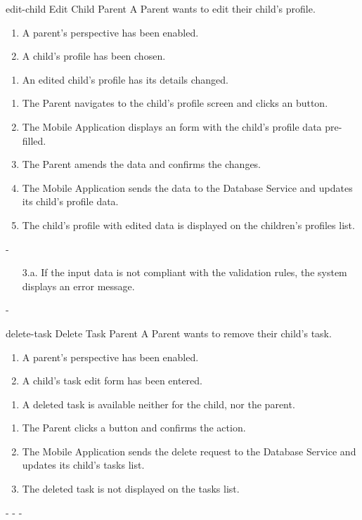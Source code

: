 {edit-child}
{Edit Child}
{Parent}
{A Parent wants to edit their child's profile.}
{\begin{enumerate} %
    \item A parent's perspective has been enabled.
    \item A child's profile has been chosen.
\end{enumerate}}
{\begin{enumerate} %
   \item An edited child's profile has its details changed.
\end{enumerate}}
{\begin{enumerate} %
   \item The Parent navigates to the child's profile screen and clicks an  button.
   \item The Mobile Application displays an  form with the child's profile data pre-filled.
   \item The Parent amends the data and confirms the changes.
   \item The Mobile Application sends the data to the Database Service and updates its child's profile data.
   \item The child's profile with edited data is displayed on the children's profiles list.
\end{enumerate}}
{-} %
{\begin{enumerate} %
    \item[3.a.] If the input data is not compliant with the validation rules, the system displays an error message.
\end{enumerate}}
{-} %


{delete-task}
{Delete Task}
{Parent}
{A Parent wants to remove their child's task.}
{\begin{enumerate} %
    \item A parent's perspective has been enabled.
    \item A child's task edit form has been entered.
\end{enumerate}}
{\begin{enumerate} %
   \item A deleted task is available neither for the child, nor the parent.
\end{enumerate}}
{\begin{enumerate} %
   \item The Parent clicks a  button and confirms the action.
   \item The Mobile Application sends the delete request to the Database Service and updates its child's tasks list.
   \item The deleted task is not displayed on the tasks list.
\end{enumerate}}
{-} %
{-} %
{-} %


